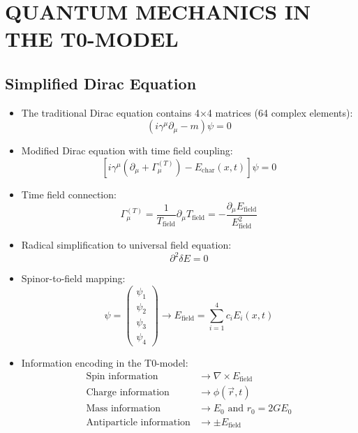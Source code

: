 \documentclass[12pt,a4paper]{article}
\begin{document}
	\section{QUANTUM MECHANICS IN THE T0-MODEL}
	
	\subsection{Simplified Dirac Equation}
	\begin{itemize}
		\item The traditional Dirac equation contains 4×4 matrices (64 complex elements):
		$$\left(i\gamma^\mu \partial_\mu - m\right) \psi = 0$$
		
		\item Modified Dirac equation with time field coupling:
		$$\boxed{\left[i\gamma^\mu\left(\partial_\mu + \Gamma_\mu^{(T)}\right) - E_{\text{char}}(x,t)\right]\psi = 0}$$
		
		\item Time field connection:
		$$\Gamma_\mu^{(T)} = \frac{1}{T_{\text{field}}} \partial_\mu T_{\text{field}} = -\frac{\partial_\mu E_{\text{field}}}{E_{\text{field}}^2}$$
		
		\item Radical simplification to universal field equation:
		$$\boxed{\partial^2 \delta E = 0}$$
		
		\item Spinor-to-field mapping:
		$$\psi = \begin{pmatrix} \psi_1 \\ \psi_2 \\ \psi_3 \\ \psi_4 \end{pmatrix} \rightarrow E_{\text{field}} = \sum_{i=1}^4 c_i E_i(x,t)$$
		
		\item Information encoding in the T0-model:
		\begin{align*}
			\text{Spin information} &\rightarrow \nabla \times E_{\text{field}}\\
			\text{Charge information} &\rightarrow \phi(\vec{r}, t)\\
			\text{Mass information} &\rightarrow E_0 \text{ and } r_0 = 2GE_0\\
			\text{Antiparticle information} &\rightarrow \pm E_{\text{field}}
		\end{align*}
	\end{itemize}
	
\end{document}
